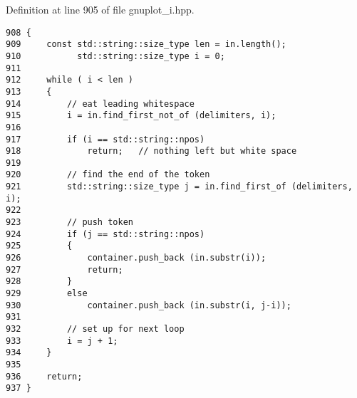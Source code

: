 Definition at line 905 of file gnuplot\_\-i.hpp.

\begin{Code}\begin{verbatim}908 {
909     const std::string::size_type len = in.length();
910           std::string::size_type i = 0;
911 
912     while ( i < len )
913     {
914         // eat leading whitespace
915         i = in.find_first_not_of (delimiters, i);
916 
917         if (i == std::string::npos)
918             return;   // nothing left but white space
919 
920         // find the end of the token
921         std::string::size_type j = in.find_first_of (delimiters, i);
922 
923         // push token
924         if (j == std::string::npos)
925         {
926             container.push_back (in.substr(i));
927             return;
928         }
929         else
930             container.push_back (in.substr(i, j-i));
931 
932         // set up for next loop
933         i = j + 1;
934     }
935 
936     return;
937 }
\end{verbatim}
\end{Code}


